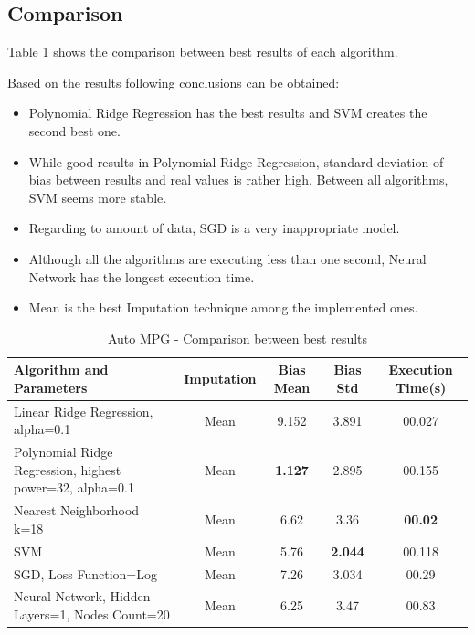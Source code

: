 \subsection{Comparison}
Table \ref{table:db1-results} shows the comparison between best results of each algorithm.

Based on the results following conclusions can be obtained:
\begin{itemize}
  \item Polynomial Ridge Regression has the best results and SVM creates the second best one.
  \item While good results in Polynomial Ridge Regression, standard deviation of bias between results and real values is rather high. Between all algorithms, SVM seems more stable.
  \item Regarding to amount of data, SGD is a very inappropriate model.
  \item Although all the algorithms are executing less than one second, Neural Network has the longest execution time.
  \item Mean is the best Imputation technique among the implemented ones.
\end{itemize}

		\begin{table}
\begin{center}
\begin{tabular}{|p{4cm}|c|c|c|c|}
\hline Algorithm and Parameters & Imputation & Bias Mean & Bias Std & Execution Time(s)\\

\hline Linear Ridge Regression, alpha=0.1 & Mean & 9.152 & 3.891 & 00.027 \\

\hline Polynomial Ridge Regression, highest power=32, alpha=0.1 & Mean & \textbf{1.127} & 2.895 & 00.155  \\

\hline Nearest Neighborhood k=18 & Mean & 6.62 & 3.36 & \textbf{00.02}  \\

\hline SVM & Mean & 5.76 & \textbf{2.044} & 00.118  \\

\hline SGD, Loss Function=Log & Mean & 7.26 & 3.034 & 00.29  \\

\hline Neural Network, Hidden Layers=1, Nodes Count=20 & Mean & 6.25 & 3.47 & 00.83  \\

\hline
\end{tabular}
    \caption{Auto MPG - Comparison between best results}
    \label{table:db1-results}
\end{center}
    \end{table}


